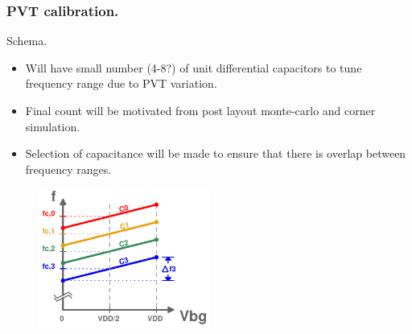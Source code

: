 \documentclass[t, screen, aspectratio=43]{beamer}
\begin{document}
\begin{frame}
	\frametitle{PVT calibration.}
	\begin{block}{Schema.}
				\vspace{2em}
		\begin{minipage}{4cm}
			\tiny

			\begin{itemize}[itemsep=4pt,label=\protect---]
				\item Will have small number (4-8?) of unit differential capacitors to tune frequency range due to PVT variation.
				\item Final count will be motivated from post layout monte-carlo and corner simulation.
				\item Selection of capacitance will be made to ensure that there is overlap between frequency ranges.
			\end{itemize}

		\end{minipage}%
		\begin{minipage}{8cm}
			\begin{figure}[htb!]
			        \centering
			        \includegraphics[width=0.5\textwidth, angle=0]{./backgate_rosc_tuning2}
			\end{figure}
		\end{minipage}%

	\end{block}	
\end{frame}
\end{document}
